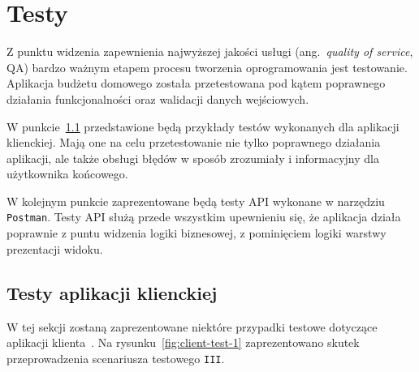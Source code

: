 \chapter{Testy}
\label{chap:testy}

Z punktu widzenia zapewnienia najwyższej jakości usługi (ang.~\emph{quality of service}, QA) bardzo ważnym etapem procesu tworzenia oprogramowania jest testowanie. Aplikacja budżetu domowego została przetestowana pod kątem poprawnego działania funkcjonalności oraz walidacji danych wejściowych.

W punkcie~\ref{sec:test-client} przedstawione będą przykłady testów wykonanych dla aplikacji klienckiej. Mają one na celu przetestowanie nie tylko poprawnego działania aplikacji, ale także obsługi błędów w sposób zrozumiały i informacyjny dla użytkownika końcowego.

W kolejnym punkcie zaprezentowane będą testy API wykonane w narzędziu \texttt{Postman}. Testy API służą przede wszystkim upewnieniu się, że aplikacja działa poprawnie z puntu widzenia logiki biznesowej, z pominięciem logiki warstwy prezentacji widoku.

\section{Testy aplikacji klienckiej}
\label{sec:test-client}

W tej sekcji zostaną zaprezentowane niektóre przypadki testowe dotyczące aplikacji klienta~\cite{test-case}. Na rysunku~\ref{fig:client-test-1} zaprezentowano skutek przeprowadzenia scenariusza testowego \texttt{III}.

